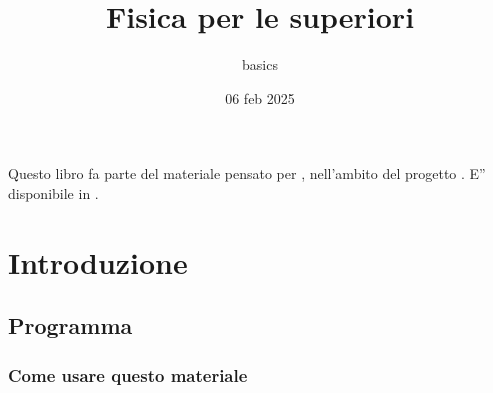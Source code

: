 \documentclass[letterpaper,10pt,italian]{jupyterBook}
\title{Fisica per le superiori}
\date{06 feb 2025}
\author{basics}
\begin{document}
\pagestyle{empty}
\sphinxmaketitle
\pagestyle{plain}
\sphinxtableofcontents
\pagestyle{normal}
\label{\detokenize{intro::doc}}


\sphinxAtStartPar
Questo libro fa parte del materiale pensato per , nell’ambito del progetto . E” disponibile in .





\sphinxstepscope


\part{Introduzione}

\sphinxstepscope


\chapter{Programma}
\label{\detokenize{ch/program:programma}}\label{\detokenize{ch/program:physics-hs-program}}\label{\detokenize{ch/program::doc}}

\section{Come usare questo materiale}
\label{\detokenize{ch/program:come-usare-questo-materiale}}
\end{document}
